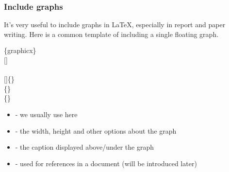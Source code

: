 \begin{frame}
	\frametitle{Include graphs}
	It's very useful to include graphs in \LaTeX, especially in report and paper writing. Here is a common template of including a single floating graph.
	\begin{command}
		\{graphicx\}\\
		[]\\
		\qquad{}\\
		\qquad{}[]\{\}\\
		\qquad{}\{\}\\
		\qquad{}\{\}\\
		\begin{itemize}
			\item {} - we usually use  here
			\item {} - the width, height and other options about the graph
			\item {} - the caption displayed above/under the graph
			\item {} - used for references in a document (will be introduced later)
		\end{itemize}
	\end{command}
\end{frame}

